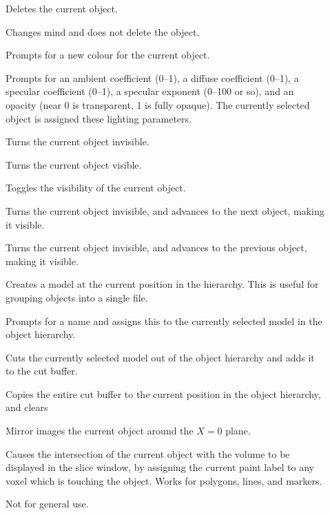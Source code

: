 \begin{description}
\item[]  Deletes the current
        object.
\item[]  Changes mind and
        does not delete the object.
\item[]  Prompts for a new colour for the
        current object.
\item[]  Prompts for an ambient
        coefficient (0--1), a diffuse coefficient (0--1), a
        specular coefficient (0--1), a specular exponent (0--100 or so),
        and an opacity (near 0 is transparent, 1 is fully opaque).
        The currently selected object is assigned these lighting parameters.
\item[]  Turns the current object invisible.
\item[]  Turns the current object visible.
\item[]  Toggles the visibility of
        the current object.
\item[]  Turns the current object invisible,
               and advances to the next object, making it visible.
\item[]  Turns the current object invisible,
               and advances to the previous object, making it visible.
\item[]  Creates a model at the current
               position in the hierarchy.  This is useful for grouping
               objects into a single file.
\item[]  Prompts for a name and
               assigns this to the currently selected model in the object
               hierarchy.
\item[]  Cuts the currently selected model
               out of the object hierarchy and adds it to the cut buffer.
\item[]  Copies the entire cut buffer to
               the current position in the object hierarchy, and clears
\item[]  Mirror images the current object
               around the $X = 0$ plane.
\item[]  Causes the intersection
     of the current object with the volume to be displayed in the
     slice window, by assigning the current paint label to any voxel
     which is touching the object.  Works for polygons, lines, and
     markers.
\item[]  Not for general use.
\end{description}

